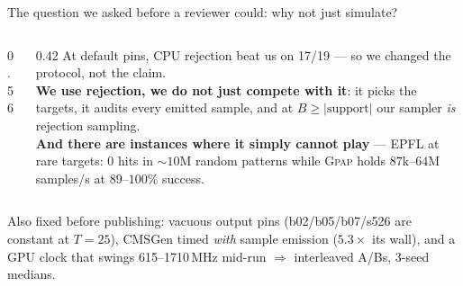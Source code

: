 \documentclass[aspectratio=169,11pt]{beamer}
\newcommand{\good}[1]{\textcolor{gpapgreen}{#1}}
\newcommand{\bad}[1]{\textcolor{gpapred}{#1}}
\newcommand{\rem}[1]{{\footnotesize\textcolor{gpapgray}{#1}}}
\newcommand{\GPAP}{\textsc{Gpap}}
\newcommand{\keyw}[1]{\textcolor{gpapblue}{\textbf{#1}}}
\begin{document}
\begin{frame}{The question we asked before a reviewer could: why not just simulate?}
  \begin{columns}[T]
    \begin{column}{0.56\textwidth}
    \end{column}
    \begin{column}{0.42\textwidth}
      \small
      At default pins, CPU rejection \bad{beat us on 17/19} --- so we changed the protocol, not
      the claim.
      \\[0.5em]
      \keyw{We use rejection, we do not just compete with it}: it picks the targets, it audits every
      emitted sample, and at $B \ge |\text{support}|$ our sampler \emph{is} rejection sampling.
      \\[0.5em]
      \good{\textbf{And there are instances where it simply cannot play}} --- EPFL at rare targets:
      \good{0 hits in ${\sim}10$M random patterns} while \GPAP{} holds $87$k--$64$M samples/s at
      $89$--$100\%$ success.
    \end{column}
  \end{columns}
  \vspace{0.8em}
  \centering
  \rem{Also fixed before publishing: vacuous output pins (b02/b05/b07/s526 are constant at $T{=}25$),
  CMSGen timed \emph{with} sample emission ($5.3\times$ its wall), and a GPU clock that swings
  615--1710\,MHz mid-run $\Rightarrow$ interleaved A/Bs, 3-seed medians.}
\end{frame}
\end{document}
